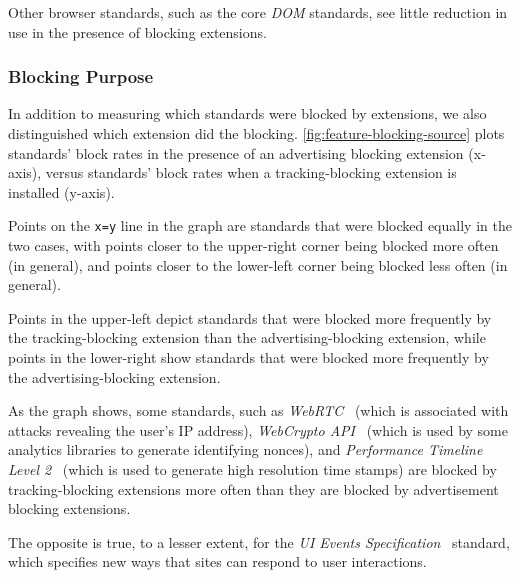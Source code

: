 Other browser standards, such as the core \textit{DOM} standards, see little
reduction in use in the presence of blocking extensions.


\subsubsection{Blocking Purpose}

In addition to measuring which standards were blocked by extensions, we also
distinguished which extension did the blocking.
\ref{fig:feature-blocking-source} plots standards' block rates in the
presence of an advertising blocking extension (x-axis), versus standards' block
rates when a tracking-blocking extension is installed (y-axis).

Points on the \texttt{x=y} line in the graph are standards that were blocked
equally in the two cases, with points closer to the upper-right corner being
blocked more often (in general), and points closer to the lower-left corner
being blocked less often (in general).

Points in the upper-left depict standards that were blocked more frequently by
the tracking-blocking extension than the advertising-blocking extension, while
points in the lower-right show standards that were blocked more frequently by
the advertising-blocking extension.

As the graph shows, some standards, such as \textit{WebRTC}~\cite{webrtcw3c}
(which is associated with attacks revealing the user's IP address),
\textit{WebCrypto API}~\cite{webcryptow3c} (which is used by some analytics
libraries to generate identifying nonces), and \textit{Performance Timeline Level
2}~\cite{perftimingw3c} (which is used to generate high resolution time stamps)
are blocked by tracking-blocking extensions more often than they are blocked by
advertisement blocking extensions.

The opposite is true, to a lesser extent, for the \textit{UI Events
Specification}~\cite{uievents3c} standard, which specifies new ways that sites
can respond to user interactions.
